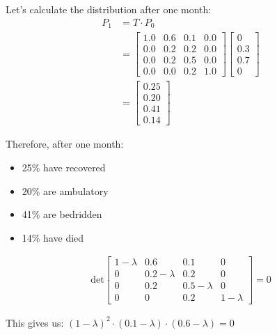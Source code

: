 \documentclass{article}
\begin{document}
Let's calculate the distribution after one month:
\begin{align*}
P_1 &= T \cdot P_0\\
&= 
\begin{bmatrix}
1.0 & 0.6 & 0.1 & 0.0 \\
0.0 & 0.2 & 0.2 & 0.0 \\
0.0 & 0.2 & 0.5 & 0.0 \\
0.0 & 0.0 & 0.2 & 1.0
\end{bmatrix}
\begin{bmatrix}
0 \\
0.3 \\
0.7 \\
0
\end{bmatrix}\\
&= 
\begin{bmatrix}
0.25 \\
0.20 \\
0.41 \\
0.14
\end{bmatrix}
\end{align*}

Therefore, after one month:
\begin{itemize}
    \item 25\% have recovered
    \item 20\% are ambulatory
    \item 41\% are bedridden
    \item 14\% have died
\end{itemize}
\begin{align*}
\text{det}
\begin{bmatrix}
1-\lambda & 0.6 & 0.1 & 0 \\
0 & 0.2-\lambda & 0.2 & 0 \\
0 & 0.2 & 0.5-\lambda & 0 \\
0 & 0 & 0.2 & 1-\lambda
\end{bmatrix} = 0
\end{align*}

This gives us: $(1-\lambda)^2 \cdot (0.1-\lambda) \cdot (0.6-\lambda) = 0$
\end{document}
